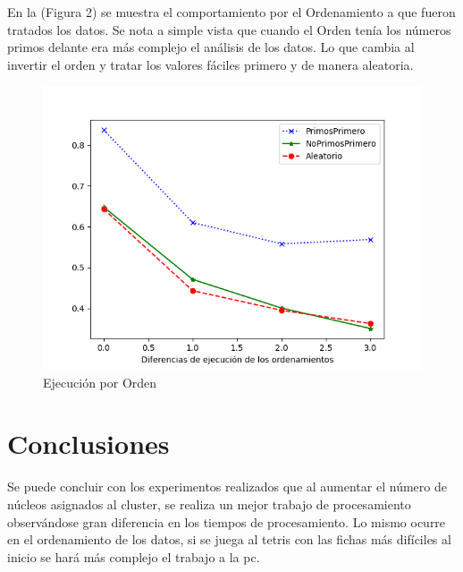 \documentclass{article}
\begin{document}
En la (Figura 2) se muestra el comportamiento  por el Ordenamiento a que fueron tratados los datos. Se nota a simple vista que cuando el Orden tenía los números primos delante era más complejo el análisis de los datos. Lo que cambia al invertir el orden y tratar los valores fáciles primero y de manera aleatoria.

\begin{figure}[H]
	\centering
	
	\includegraphics[scale=0.6]{Figure_3.png}
	\caption{Ejecución por Orden}
	\label{fig:f2}
\end{figure}

\section{Conclusiones}
Se puede concluir con los experimentos realizados que al aumentar el número de núcleos asignados al cluster, se realiza un mejor trabajo de procesamiento observándose gran diferencia en los tiempos de procesamiento. Lo mismo ocurre en el ordenamiento de los datos, si se juega al tetris con las fichas más difíciles al inicio se hará más complejo el trabajo a la pc.



\end{document}

